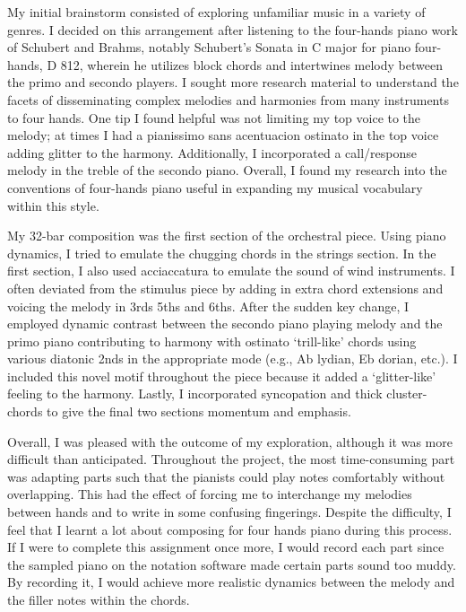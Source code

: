 \documentclass[11pt,a4paper]{article}
\begin{document}
My initial brainstorm consisted of exploring unfamiliar music in a variety of genres. I decided on this arrangement after listening to the four-hands piano work of Schubert and Brahms, notably Schubert’s Sonata in C major for piano four-hands, D 812, wherein he utilizes block chords and intertwines melody between the primo and secondo players. I sought more research material to understand the facets of disseminating complex melodies and harmonies from many instruments to four hands. One tip I found helpful was not limiting my top voice to the melody; at times I had a pianissimo sans acentuacion ostinato in the top voice adding glitter to the harmony. Additionally, I incorporated a call/response melody in the treble of the secondo piano. Overall, I found my research into the conventions of four-hands piano useful in expanding my musical vocabulary within this style.

My 32-bar composition was the first section of the orchestral piece. Using piano dynamics, I tried to emulate the chugging chords in the strings section. In the first section, I also used acciaccatura to emulate the sound of wind instruments. I often deviated from the stimulus piece by adding in extra chord extensions and voicing the melody in 3rds 5ths and 6ths. After the sudden key change, I employed dynamic contrast between the secondo piano playing melody and the primo piano contributing to harmony with ostinato ‘trill-like’ chords using various diatonic 2nds in the appropriate mode (e.g., Ab lydian, Eb dorian, etc.). I included this novel motif throughout the piece because it added a ‘glitter-like’ feeling to the harmony. Lastly, I incorporated syncopation and thick cluster-chords to give the final two sections momentum and emphasis.

Overall, I was pleased with the outcome of my exploration, although it was more difficult than anticipated. Throughout the project, the most time-consuming part was adapting parts such that the pianists could play notes comfortably without overlapping. This had the effect of forcing me to interchange my melodies between hands and to write in some confusing fingerings. Despite the difficulty, I feel that I learnt a lot about composing for four hands piano during this process. If I were to complete this assignment once more, I would record each part since the sampled piano on the notation software made certain parts sound too muddy. By recording it, I would achieve more realistic dynamics between the melody and the filler notes within the chords.
\end{document}
